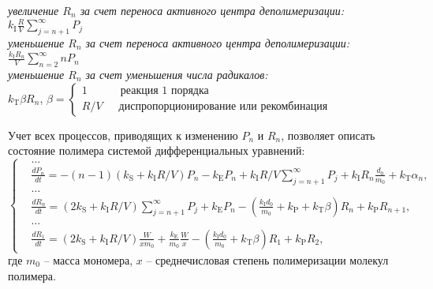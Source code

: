 \begin{center}
	\textit{увеличение $R_n$ за счет переноса активного центра деполимеризации:} \\
	${\displaystyle k_\mathrm{I} \frac{R}{V} \sum_{j=n+1}^{\infty} P_j}$ \\
	\textit{уменьшение $R_n$ за счет переноса активного центра деполимеризации:} \\
	${\displaystyle \frac{k_\mathrm{I} R_n}{V} \sum_{n=2}^{\infty} n P_n}$ \\
	\textit{уменьшение $R_n$ за счет уменьшения числа радикалов:} \\
	$k_\mathrm{T} \beta R_n$, $\beta = \left\{
	\begin{array}{l}
		1 \quad\quad\quad \text{реакция 1 порядка} \\
		R / V \quad\;\: \text{диспропорционирование или рекомбинация}
	\end{array}\right.$ \\
\end{center}

Учет всех процессов, приводящих к изменению $P_n$ и $R_n$, позволяет описать состояние полимера системой дифференциальных уравнений:
\begin{equation} \label{eq:kinetic_system_original}
	\left\{
	\begin{aligned}
		&\dots \\
		&\frac{d P_n}{d t} = -(n-1)\left(k_\mathrm{S} + k_\mathrm{I} R / V\right) P_n - k_\mathrm{E} P_n + k_\mathrm{I} R / V \sum_{j=n+1}^{\infty} P_j + k_\mathrm{I} R_n \frac{d_0}{m_0} + k_\mathrm{T} \alpha_n, \\
		&\dots \\
		&\frac{d R_n}{d t} = \left(2 k_\mathrm{S} + k_\mathrm{I} R / V\right) \sum_{j=n+1}^{\infty} P_j + k_\mathrm{E} P_n - \left(\frac{k_\mathrm{I} d_0}{m_0} + k_\mathrm{P} + k_\mathrm{T} \beta\right) R_n + k_\mathrm{P} R_{n+1}, \\
		&\dots \\
		&\frac{d R_1}{d t} = \left(2 k_\mathrm{S} + k_\mathrm{I} R / V\right) \frac{W}{x m_0} + \frac{k_\mathrm{E}}{m_0} \frac{W}{x} - \left(\frac{k_\mathrm{I} d_0}{m_0} + k_\mathrm{T} \beta\right) R_1 + k_\mathrm{P} R_2,
	\end{aligned}
	\right.
\end{equation}
где $m_0$ -- масса мономера, $x$ -- среднечисловая степень полимеризации молекул полимера. 

